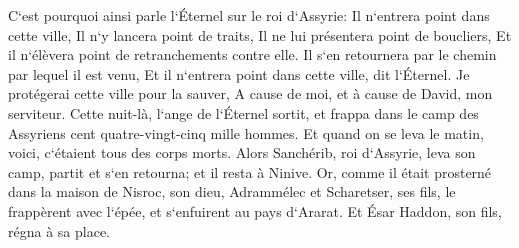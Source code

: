 \verse C`est pourquoi ainsi parle l`Éternel sur le roi d`Assyrie: Il n`entrera point dans cette ville, Il n`y lancera point de traits, Il ne lui présentera point de boucliers, Et il n`élèvera point de retranchements contre elle. 
\verse Il s`en retournera par le chemin par lequel il est venu, Et il n`entrera point dans cette ville, dit l`Éternel. 
\verse Je protégerai cette ville pour la sauver, A cause de moi, et à cause de David, mon serviteur. 
\verse Cette nuit-là, l`ange de l`Éternel sortit, et frappa dans le camp des Assyriens cent quatre-vingt-cinq mille hommes. Et quand on se leva le matin, voici, c`étaient tous des corps morts. 
\verse Alors Sanchérib, roi d`Assyrie, leva son camp, partit et s`en retourna; et il resta à Ninive. 
\verse Or, comme il était prosterné dans la maison de Nisroc, son dieu, Adrammélec et Scharetser, ses fils, le frappèrent avec l`épée, et s`enfuirent au pays d`Ararat. Et Ésar Haddon, son fils, régna à sa place. 

\chapter{}

